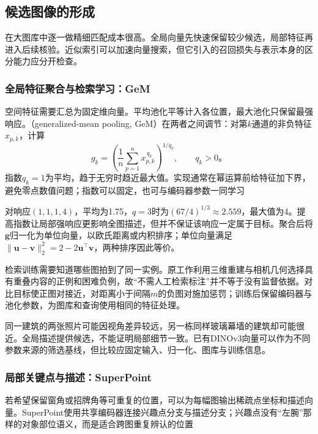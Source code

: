 \subsection{候选图像的形成}
\label{sec:vision-recognition-candidates}

在大图库中逐一做精细匹配成本很高。全局向量先快速保留较少候选，局部特征再进入后续核验。近似索引可以加速向量搜索，但它引入的召回损失与表示本身的区分能力应分开检查。

\subsubsection{全局特征聚合与检索学习：GeM}
\label{sec:vision-recognition-gem}

空间特征需要汇总为固定维向量。平均池化平等计入各位置，最大池化只保留最强响应。（generalized-mean pooling, GeM）在两者之间调节：对第$k$通道的非负特征$x_{p,k}$，计算
\begin{equation}
 g_k=\left(\frac1n\sum_{p=1}^{n}x_{p,k}^{\,q_k}\right)^{1/q_k},
 \qquad q_k>0\text{。}
 \label{eq:vision-gem}
\end{equation}
指数$q_k=1$为平均，趋于无穷时趋近最大值。实现通常在幂运算前给特征加下界，避免零点数值问题；指数可以固定，也可与编码器参数一同学习

对响应$(1,1,1,4)$，平均为1.75，$q=3$时为$(67/4)^{1/3}\approx2.559$，最大值为4。提高指数让局部强响应更影响全图描述，但并不保证该响应一定属于目标。聚合后将$\bm{g}$归一化为单位向量，以欧氏距离或内积排序；单位向量满足$\lVert\bm{u}-\bm{v}\rVert_2^2=2-2\bm{u}^{\top}\bm{v}$，两种排序因此等价。

检索训练需要知道哪些图拍到了同一实例。原工作利用三维重建与相机几何选择具有重叠内容的正例和困难负例，故“不需人工检索标注”并不等于没有监督依据。对比目标使正图对接近，对距离小于间隔$m$的负图对施加惩罚；训练后保留编码器与池化参数，为图库和查询使用相同的特征处理。

同一建筑的两张照片可能因视角差异较远，另一栋同样玻璃幕墙的建筑却可能很近。全局描述提供候选，不能证明局部细节一致。已有DINOv3向量可以作为不同参数来源的筛选基线，但比较应固定输入、归一化、图库与训练信息。

\Needspace{55mm}
\subsubsection{局部关键点与描述：SuperPoint}
\label{sec:vision-recognition-superpoint}

若希望保留窗角或招牌角等可重复的位置，可以为每幅图输出稀疏点坐标和描述向量。SuperPoint使用共享编码器连接兴趣点分支与描述分支；兴趣点没有“左腕”那样的对象部位语义，而是适合跨图重复辨认的位置

